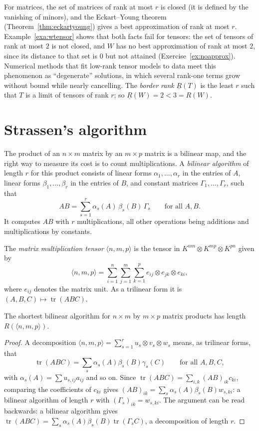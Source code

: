 For matrices, the set of matrices of rank at most $r$ is closed (it is defined by the vanishing of minors), and the Eckart--Young
theorem (Theorem~\ref{thm:eckartyoung}) gives a best approximation of rank at most $r$. Example~\ref{exa:wtensor} shows that both
facts fail for tensors: the set of tensors of rank at most $2$ is not closed, and $W$ has no best approximation of rank at most
$2$, since its distance to that set is $0$ but not attained (Exercise~\ref{ex:noapprox}). Numerical methods that fit low-rank tensor
models to data meet this phenomenon as ``degenerate'' solutions, in which several rank-one terms grow without bound while
nearly cancelling. The \emph{border rank} $\underline R(T)$ is the least $r$ such that $T$ is a limit of tensors of rank $r$; so
$\underline R(W)=2<3=R(W)$.

\section{Strassen's algorithm}

The product of an $n\times m$ matrix by an $m\times p$ matrix is a bilinear map, and the right way to measure its cost is to count
multiplications. A \emph{bilinear algorithm} of length $r$ for this product consists of linear forms $\alpha_1,\dots,\alpha_r$ in the
entries of $A$, linear forms $\beta_1,\dots,\beta_r$ in the entries of $B$, and constant matrices $\Gamma_1,\dots,\Gamma_r$, such that
\[
AB=\sum_{s=1}^r\alpha_s(A)\,\beta_s(B)\,\Gamma_s\qquad\text{for all }A,B.
\]
It computes $AB$ with $r$ multiplications, all other operations being additions and multiplications by constants.

\begin{definition}\label{def:mmtensor}
The \emph{matrix multiplication tensor} $\langle n,m,p\rangle$ is the tensor in $K^{nm}\otimes K^{mp}\otimes K^{pn}$ given by
\[
\langle n,m,p\rangle=\sum_{i=1}^n\sum_{j=1}^m\sum_{k=1}^pe_{ij}\otimes e_{jk}\otimes e_{ki},
\]
where $e_{ij}$ denotes the matrix unit. As a trilinear form it is $(A,B,C)\mapsto\operatorname{tr}(ABC)$.
\end{definition}

\begin{theorem}\label{thm:bilinear}
The shortest bilinear algorithm for $n\times m$ by $m\times p$ matrix products has length $R(\langle n,m,p\rangle)$.
\end{theorem}
\begin{proof}
A decomposition $\langle n,m,p\rangle=\sum_{s=1}^ru_s\otimes v_s\otimes w_s$ means, as trilinear forms, that
\[
\operatorname{tr}(ABC)=\sum_s\alpha_s(A)\beta_s(B)\gamma_s(C)\qquad\text{for all }A,B,C,
\]
with $\alpha_s(A)=\sum u_{s,ij}a_{ij}$ and so on. Since $\operatorname{tr}(ABC)=\sum_{i,k}(AB)_{ik}c_{ki}$, comparing the coefficients of $c_{ki}$ gives $(AB)_{ik}=\sum_s\alpha_s(A)\beta_s(B)w_{s,ki}$: a bilinear
algorithm of length $r$ with $(\Gamma_s)_{ik}=w_{s,ki}$. The argument can be read backwards: a bilinear algorithm gives
$\operatorname{tr}(ABC)=\sum_s\alpha_s(A)\beta_s(B)\operatorname{tr}(\Gamma_sC)$, a decomposition of length $r$.
\end{proof}

